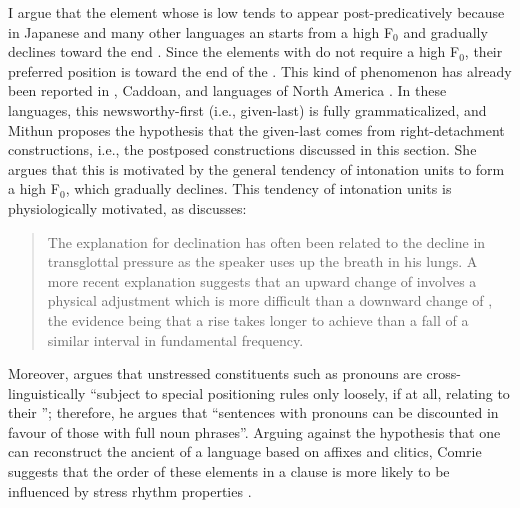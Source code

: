 I argue that the element whose  is low tends to appear post-predicatively
because in Japanese and many other languages
an  starts from a high F$_{0}$ and gradually declines toward the end 
\cite{libermanpierrehumbert84,cruttenden86,duboisetal93,chafe94,prieto96,truckenbrodt04,denetal10}.
Since the elements with  do not require a high F$_{0}$,
their preferred position is toward the end of the .
This kind of phenomenon has already been reported in , Caddoan, and  languages of North America \cite{mithun95}.
In these languages,
this newsworthy-first (i.e., given-last)  is fully grammaticalized, and Mithun proposes the hypothesis that the given-last  comes from right-detachment constructions, i.e., the postposed constructions discussed in this section.
She argues that this  is motivated by the general tendency of intonation units to form a high F$_{0}$, which gradually declines.
This tendency of intonation units is physiologically motivated,
as  discusses:
%
\begin{quote}
The explanation for declination has often been related to the decline in transglottal pressure as the speaker uses up the breath in his lungs.
A more recent explanation suggests that an upward change of  involves a physical adjustment which is more difficult than a downward change of ,
the evidence being that a rise takes longer to achieve than a fall of a similar interval in fundamental frequency.
\cite[][168]{cruttenden86}
\end{quote}
%

Moreover,  argues that unstressed constituents such as  pronouns are cross-linguistically ``subject to special positioning rules only loosely, if at all, relating to their '';
therefore, he argues that ``sentences with pronouns can be discounted in favour of those with full noun phrases''.
Arguing against the hypothesis \cite{givon79}
that one can reconstruct the ancient  of a language based on  affixes and clitics,
Comrie suggests that the order of these elements in a clause is more likely to be influenced by stress rhythm properties \cite[][218]{comrie89}.

